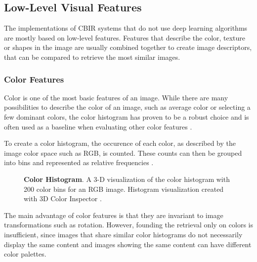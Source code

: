 \documentclass[12pt]{report}
\begin{document}
\pagebreak
\subsection{Low-Level Visual Features}
The implementations of CBIR systems that do not use deep learning algorithms are mostly based on low-level features. Features that describe the color, texture or shapes in the image are usually combined together to create image descriptors, that can be compared to retrieve the most similar images.

\subsubsection{Color Features}
Color is one of the most basic features of an image. While there are many possibilities to describe the color of an image, such as average color or selecting a few dominant colors, the color histogram has proven to be a robust choice and is often used as a baseline when evaluating other color features \cite{Torres_content-basedimage}.

To create a color histogram, the occurence of each color, as described by the image color space such as RGB, is counted. These counts can then be grouped into bins and represented as relative frequencies \cite{Swain1991}.

\begin{figure}[h]
\centering
{}
\caption{\label{fig:color_hist} \textbf{Color Histogram}. A 3-D visualization of the color histogram with 200 color bins for an RGB image. Histogram visualization created with 3D Color Inspector \cite{barthel_3d_nodate}.}
\end{figure}

The main advantage of color features is that they are invariant to image transformations such as rotation. However, founding the retrieval only on colors is insufficient, since images that share similar color histograms do not necessarily display the same content and images showing the same content can have different color palettes.
\end{document}
